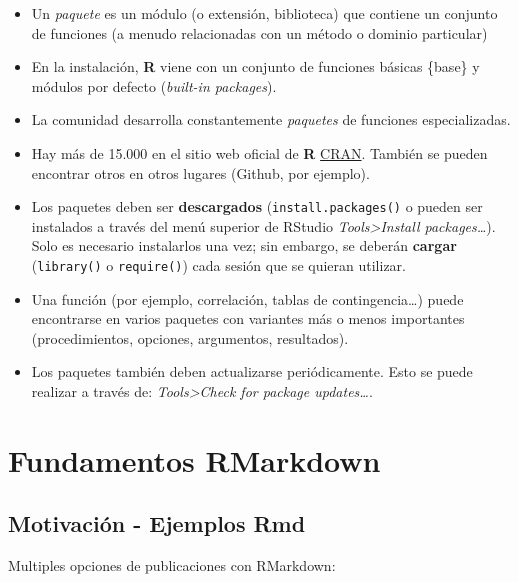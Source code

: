 \documentclass[
]{article}
\begin{document}
\begin{itemize}
\item
  Un \emph{paquete} es un módulo (o extensión, biblioteca) que contiene
  un conjunto de funciones (a menudo relacionadas con un método o
  dominio particular)
\item
  En la instalación, \textbf{R} viene con un conjunto de funciones
  básicas \{base\} y módulos por defecto (\emph{built-in packages}).
\item
  La comunidad desarrolla constantemente \emph{paquetes} de funciones
  especializadas.
\item
  Hay más de 15.000 en el sitio web oficial de \textbf{R}
  \href{https://cran.r-project.org/web/packages/}{CRAN}. También se
  pueden encontrar otros en otros lugares (Github, por ejemplo).
\item
  Los paquetes deben ser \textbf{descargados}
  (\texttt{install.packages()} o pueden ser instalados a través del menú
  superior de RStudio \emph{Tools\textgreater Install
  packages\ldots{}}). Solo es necesario instalarlos una vez; sin
  embargo, se deberán \textbf{cargar} (\texttt{library()} o
  \texttt{require()}) cada sesión que se quieran utilizar.
\item
  Una función (por ejemplo, correlación, tablas de contingencia\ldots)
  puede encontrarse en varios paquetes con variantes más o menos
  importantes (procedimientos, opciones, argumentos, resultados).
\item
  Los paquetes también deben actualizarse periódicamente. Esto se puede
  realizar a través de: \emph{Tools\textgreater Check for package
  updates\ldots{}}.
\end{itemize}

\hypertarget{fundamentos-rmarkdown}{%
\section{Fundamentos RMarkdown}\label{fundamentos-rmarkdown}}

\hypertarget{motivaciuxf3n---ejemplos-rmd}{%
\subsection{Motivación - Ejemplos
Rmd}\label{motivaciuxf3n---ejemplos-rmd}}

Multiples opciones de publicaciones con RMarkdown:
\end{document}

